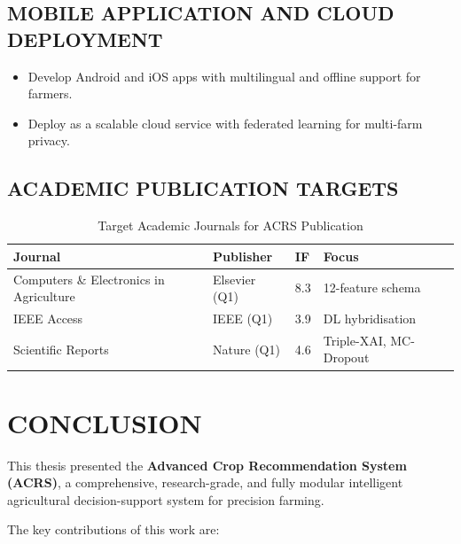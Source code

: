 \documentclass[12pt,a4paper,oneside]{report}
\begin{document}
\section{MOBILE APPLICATION AND CLOUD DEPLOYMENT}
\begin{itemize}[leftmargin=*, label=$\bullet$]
  \item Develop Android and iOS apps with multilingual and offline support for farmers.
  \item Deploy as a scalable cloud service with federated learning for multi-farm privacy.
\end{itemize}

\section{ACADEMIC PUBLICATION TARGETS}

\begin{table}[H]
\centering
\caption{Target Academic Journals for ACRS Publication}
\label{tab:journals}
\renewcommand{\arraystretch}{1.3}
\begin{tabular}{p{5cm} p{2.5cm} p{1.5cm} p{3.5cm}}
\toprule
\textbf{Journal} & \textbf{Publisher} & \textbf{IF} & \textbf{Focus} \\
\midrule
Computers \& Electronics in Agriculture & Elsevier (Q1) & 8.3 & 12-feature schema \\
IEEE Access & IEEE (Q1) & 3.9 & DL hybridisation \\
Scientific Reports & Nature (Q1) & 4.6 & Triple-XAI, MC-Dropout \\
\bottomrule
\end{tabular}
\end{table}

\chapter{CONCLUSION}

This thesis presented the \textbf{Advanced Crop Recommendation System (ACRS)}, a comprehensive, research-grade, and fully modular intelligent agricultural decision-support system for precision farming.

The key contributions of this work are:
\end{document}
